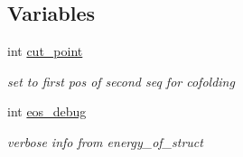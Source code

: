 \subsection*{Variables}
\begin{DoxyCompactItemize}
\item 
\mbox{\label{group__eval_gab9b2c3a37a5516614c06d0ab54b97cda}} 
int \hyperlink{group__eval_gab9b2c3a37a5516614c06d0ab54b97cda}{cut\+\_\+point}
\begin{DoxyCompactList}\small\item\em set to first pos of second seq for cofolding \end{DoxyCompactList}\item 
\mbox{\label{group__eval_ga567530678f6260a1a649a5beca5da4c5}} 
int \hyperlink{group__eval_ga567530678f6260a1a649a5beca5da4c5}{eos\+\_\+debug}
\begin{DoxyCompactList}\small\item\em verbose info from energy\+\_\+of\+\_\+struct \end{DoxyCompactList}\end{DoxyCompactItemize}
